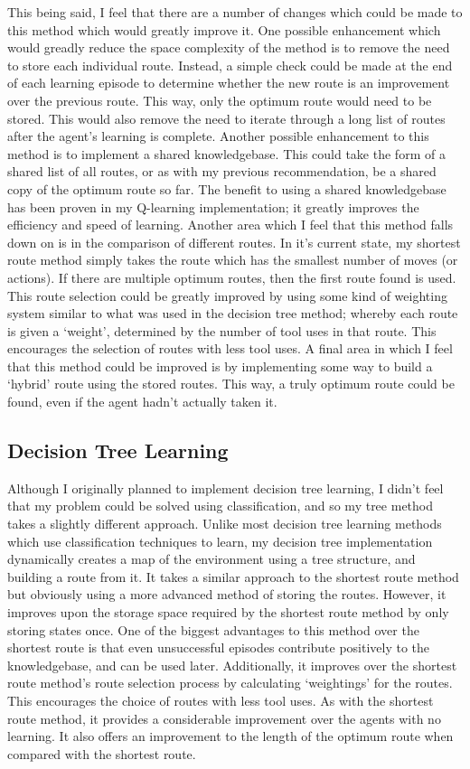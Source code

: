 \documentclass[a4paper,oneside]{report}
\begin{document}
This being said, I feel that there are a number of changes which could be made to this method which would greatly improve it. One possible enhancement which would greadly reduce the space complexity of the method is to remove the need to store each individual route. Instead, a simple check could be made at the end of each learning episode to determine whether the new route is an improvement over the previous route. This way, only the optimum route would need to be stored. This would also remove the need to iterate through a long list of routes after the agent's learning is complete. Another possible enhancement to this method is to implement a shared knowledgebase. This could take the form of a shared list of all routes, or as with my previous recommendation, be a shared copy of the optimum route so far. The benefit to using a shared knowledgebase has been proven in my Q-learning implementation; it greatly improves the efficiency and speed of learning. Another area which I feel that this method falls down on is in the comparison of different routes. In it's current state, my shortest route method simply takes the route which has the smallest number of moves (or actions). If there are multiple optimum routes, then the first route found is used. This route selection could be greatly improved by using some kind of weighting system similar to what was used in the decision tree method; whereby each route is given a `weight', determined by the number of tool uses in that route. This encourages the selection of routes with less tool uses. A final area in which I feel that this method could be improved is by implementing some way to build a `hybrid' route using the stored routes. This way, a truly optimum route could be found, even if the agent hadn't actually taken it.

\subsection{Decision Tree Learning}

Although I originally planned to implement decision tree learning, I didn't feel that my problem could be solved using classification, and so my tree method takes a slightly different approach. Unlike most decision tree learning methods which use classification techniques to learn, my decision tree implementation dynamically creates a map of the environment using a tree structure, and building a route from it. It takes a similar approach to the shortest route method but obviously using a more advanced method of storing the routes. However, it improves upon the storage space required by the shortest route method by only storing states once. One of the biggest advantages to this method over the shortest route is that even unsuccessful episodes contribute positively to the knowledgebase, and can be used later. Additionally, it improves over the shortest route method's route selection process by calculating `weightings' for the routes. This encourages the choice of routes with less tool uses. As with the shortest route method, it provides a considerable improvement over the agents with no learning. It also offers an improvement to the length of the optimum route when compared with the shortest route. 
\end{document}
